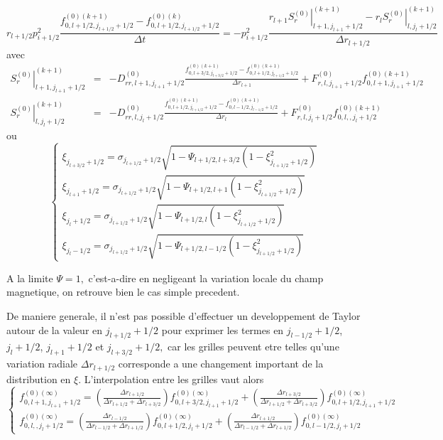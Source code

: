 \[
r_{l+1/2}p_{i+1/2}^{2}\frac{f_{0,l+1/2,j_{l+1/2}+1/2}^{\left(0\right)(k+1)}-f_{0,l+1/2,j_{l+1/2}+1/2}^{\left(0\right)(k)}}{\Delta t}=-p_{i+1/2}^{2}\frac{r_{l+1}\left.S_{r}^{\left(0\right)}\right|_{l+1,j_{l+1}+1/2}^{(k+1)}-r_{l}\left.S_{r}^{\left(0\right)}\right|_{l,j_{l}+1/2}^{(k+1)}}{\Delta r_{l+1/2}}\]
 avec \begin{eqnarray*}
\left.S_{r}^{\left(0\right)}\right|_{l+1,j_{l+1}+1/2}^{(k+1)} & = & -D_{rr,l+1,j_{l+1}+1/2}^{\left(0\right)}\frac{f_{0,l+3/2,j_{l+3/2}+1/2}^{\left(0\right)(k+1)}-f_{0,l+1/2,j_{l+1/2}+1/2}^{\left(0\right)(k+1)}}{\Delta r_{l+1}}+F_{r,l,j_{l+1}+1/2}^{\left(0\right)}f_{0,l+1,j_{l+1}+1/2}^{\left(0\right)(k+1)}\\
\left.S_{r}^{\left(0\right)}\right|_{l,j_{l}+1/2}^{(k+1)} & = & -D_{rr,l,j_{l}+1/2}^{\left(0\right)}\frac{f_{0,l+1/2,j_{l+1/2}+1/2}^{\left(0\right)(k+1)}-f_{0,l-1/2,j_{l-1/2}+1/2}^{\left(0\right)(k+1)}}{\Delta r_{l}}+F_{r,l,j_{l}+1/2}^{\left(0\right)}f_{0,l,,j_{l}+1/2}^{\left(0\right)(k+1)}\end{eqnarray*}
 ou \[
\left\{ \begin{array}{l}
\xi_{j_{l+3/2}+1/2}=\sigma_{j_{l+1/2}+1/2}\sqrt{1-\Psi_{l+1/2,l+3/2}\left(1-\xi_{j_{l+1/2}+1/2}^{2}\right)}\\
\xi_{j_{l+1}+1/2}=\sigma_{j_{l+1/2}+1/2}\sqrt{1-\Psi_{l+1/2,l+1}\left(1-\xi_{j_{l+1/2}+1/2}^{2}\right)}\\
\xi_{j_{l}+1/2}=\sigma_{j_{l+1/2}+1/2}\sqrt{1-\Psi_{l+1/2,l}\left(1-\xi_{j_{l+1/2}+1/2}^{2}\right)}\\
\xi_{j_{l}-1/2}=\sigma_{j_{l+1/2}+1/2}\sqrt{1-\Psi_{l+1/2,l-1/2}\left(1-\xi_{j_{l+1/2}+1/2}^{2}\right)}\end{array}\right.\]


A la limite $\Psi=1,$ c'est-a-dire en negligeant la variation locale
du champ magnetique, on retrouve bien le cas simple precedent.

De maniere generale, il n'est pas possible d'effectuer un developpement
de Taylor autour de la valeur en $j_{l+1/2}+1/2$ pour exprimer les
termes en $j_{l-1/2}+1/2$, $j_{l}+1/2$, $j_{l+1}+1/2$ et $j_{l+3/2}+1/2,$
car les grilles peuvent etre telles qu'une variation radiale $\Delta r_{l+1/2}$
corresponde a une changement important de la distribution en $\xi$.
L'interpolation entre les grilles vaut alors \[
\left\{ \begin{array}{l}
f_{0,l+1,j_{l+1}+1/2}^{\left(0\right)(\infty)}=\left(\frac{\Delta r_{l+1/2}}{\Delta r_{l+1/2}+\Delta r_{l+3/2}}\right)f_{0,l+3/2,j_{l+1}+1/2}^{\left(0\right)(\infty)}+\left(\frac{\Delta r_{l+3/2}}{\Delta r_{l+1/2}+\Delta r_{l+3/2}}\right)f_{0,l+1/2,j_{l+1}+1/2}^{\left(0\right)(\infty)}\\
f_{0,l,,j_{l}+1/2}^{\left(0\right)(\infty)}=\left(\frac{\Delta r_{l-1/2}}{\Delta r_{l-1/2}+\Delta r_{l+1/2}}\right)f_{0,l+1/2,j_{l}+1/2}^{\left(0\right)(\infty)}+\left(\frac{\Delta r_{l+1/2}}{\Delta r_{l-1/2}+\Delta r_{l+1/2}}\right)f_{0,l-1/2,j_{l}+1/2}^{\left(0\right)(\infty)}\end{array}\right.\]


